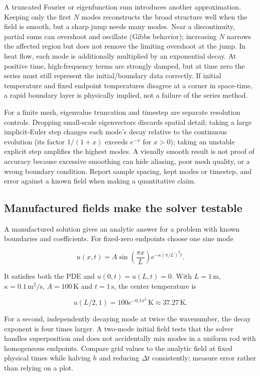 A truncated Fourier or eigenfunction sum introduces another approximation. Keeping only the first \(N\) modes reconstructs the broad structure well when the field is smooth, but a sharp jump needs many modes. Near a discontinuity, partial sums can overshoot and oscillate (Gibbs behavior); increasing \(N\) narrows the affected region but does not remove the limiting overshoot at the jump. In heat flow, each mode is additionally multiplied by an exponential decay. At positive time, high-frequency terms are strongly damped, but at time zero the series must still represent the initial/boundary data correctly. If initial temperature and fixed endpoint temperatures disagree at a corner in space-time, a rapid boundary layer is physically implied, not a failure of the series method.

For a finite mesh, eigenvalue truncation and timestep are separate resolution controls. Dropping small-scale eigenvectors discards spatial detail; taking a large implicit-Euler step changes each mode's decay relative to the continuous evolution (its factor \(1/(1+x)\) exceeds \(e^{-x}\) for \(x>0\)); taking an unstable explicit step amplifies the highest modes. A visually smooth result is not proof of accuracy because excessive smoothing can hide aliasing, poor mesh quality, or a wrong boundary condition. Report sample spacing, kept modes or timestep, and error against a known field when making a quantitative claim.

\subsection{Manufactured fields make the solver testable}\label{04-visual-computing-ii-ch030-manufactured-fields-make-the-solver-testable}

A manufactured solution gives an analytic answer for a problem with known boundaries and coefficients. For fixed-zero endpoints choose one sine mode

\[
u(x,t)=A\sin\left(\frac{\pi x}{L}\right)e^{-\kappa(\pi/L)^2t}.
\]

It satisfies both the PDE and \(u(0,t)=u(L,t)=0\). With \(L=1\,\mathrm m\), \(\kappa=0.1\,\mathrm{m^2/s}\), \(A=100\,\mathrm K\) and \(t=1\,\mathrm s\), the center temperature is

\[
u(L/2,1)=100e^{-0.1\pi^2}\,\mathrm K\approx37.27\,\mathrm K.
\]

For a second, independently decaying mode at twice the wavenumber, the decay exponent is four times larger. A two-mode initial field tests that the solver handles superposition and does not accidentally mix modes in a uniform rod with homogeneous endpoints. Compare grid values to the analytic field at fixed physical times while halving \(h\) and reducing \(\Delta t\) consistently; measure error rather than relying on a plot.

